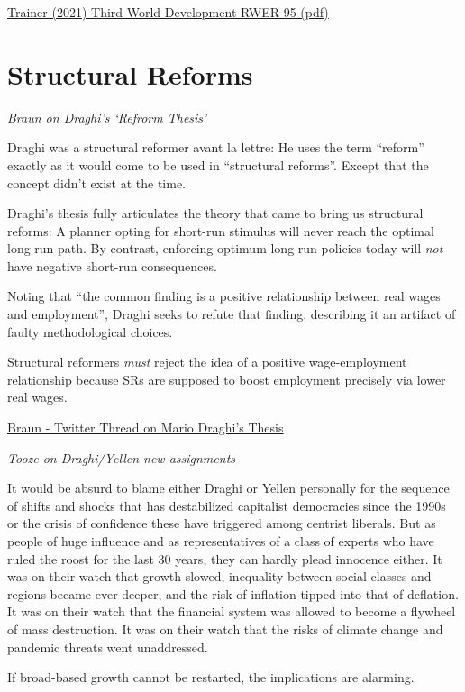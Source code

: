 \documentclass[
]{book}
\begin{document}
\href{Trainer_2021_Third_World_Development.pdf}{Trainer (2021) Third World Development RWER 95 (pdf)}

\hypertarget{structural-reforms}{%
\section{Structural Reforms}\label{structural-reforms}}

\emph{Braun on Draghi's `Refrorm Thesis'}

Draghi was a structural reformer avant la lettre: He uses the term ``reform'' exactly as it would come to be used in ``structural reforms''. Except that the concept didn't exist at the time.

Draghi's thesis fully articulates the theory that came to bring us structural reforms: A planner opting for short-run stimulus will never reach the optimal long-run path. By contrast, enforcing optimum long-run policies today will \emph{not} have negative short-run consequences.

Noting that ``the common finding is a positive relationship between real wages and employment'', Draghi seeks to refute that finding, describing it an artifact of faulty methodological choices.

Structural reformers \emph{must} reject the idea of a positive wage-employment relationship because SRs are supposed to boost employment precisely via lower real wages.

\href{https://twitter.com/BJMbraun/status/1387737805405802498}{Braun - Twitter Thread on Mario Draghi's Thesis}

\emph{Tooze on Draghi/Yellen new assignments}

It would be absurd to blame either Draghi or Yellen personally for the sequence of shifts and shocks that has destabilized capitalist democracies since the 1990s or the crisis of confidence these have triggered among centrist liberals. But as people of huge influence and as representatives of a class of experts who have ruled the roost for the last 30 years, they can hardly plead innocence either. It was on their watch that growth slowed, inequality between social classes and regions became ever deeper, and the risk of inflation tipped into that of deflation. It was on their watch that the financial system was allowed to become a flywheel of mass destruction. It was on their watch that the risks of climate change and pandemic threats went unaddressed.

If broad-based growth cannot be restarted, the implications are alarming.
\end{document}
